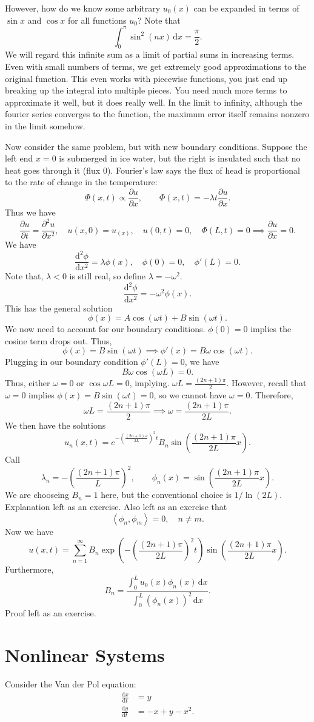 However, how do we know some arbitrary $u_0(x)$ can be expanded in terms of $\sin x$ and $\cos x$ for all functions $u_0$? Note that
\[
	\int_{0}^{\pi } \sin ^2(nx) \,\mathrm{d} x=\frac{\pi }{2}
.\]
We will regard this infinite sum as a limit of partial sums in increasing terms. Even with small numbers of terms, we get extremely good approximations to the original function. This even works with piecewise functions, you just end up breaking up the integral into multiple pieces. You need much more terms to approximate it well, but it does really well. In the limit to infinity, although the fourier series converges to the function, the maximum error itself remains nonzero in the limit somehow.

Now consider the same problem, but with new boundary conditions. Suppose the left end $x=0$ is submerged in ice water, but the right is insulated such that no heat goes through it (flux 0). Fourier's law says the flux of head is proportional to the rate of change in the temperature:
\[
	\Phi(x,t) \propto \frac{\partial u}{\partial x} ,\qquad \Phi (x,t)=-\lambda t \frac{\partial u}{\partial x} 
.\]
Thus we have
\[
	\frac{\partial u}{\partial t} =\frac{\partial ^2u}{\partial x^2} ,\quad u(x,0)=u_(x),\quad u(0,t)=0,\quad \Phi (L,t)=0\implies \frac{\partial u}{\partial x} =0
.\]
We have
\[
	\frac{\mathrm{d}^2\phi  }{\mathrm{d}x^2} =\lambda \phi (x),\quad \phi (0)=0,\quad \phi '(L)=0
.\]
Note that, $\lambda <0$ is still real, so define $\lambda =-\omega ^2$.
\[
	\frac{\mathrm{d}^2\phi }{\mathrm{d}x^2} =-\omega ^2\phi (x)
.\]
This has the general solution
\[
	\phi (x)=A\cos (\omega t)+B\sin (\omega t)
.\]
We now need to account for our boundary conditions. $\phi (0)=0$ implies the cosine term drops out. Thus,
\[
	\phi (x)=B\sin (\omega t)\implies \phi '(x)=B\omega \cos (\omega t)
.\]
Plugging in our boundary condition $\phi '(L)=0$, we have
\[
	B\omega \cos (\omega L)=0
.\]
Thus, either $\omega =0$ or $\cos \omega L=0$, implying. $\omega L = \frac{(2n+1)\pi }{2}$. However, recall that $\omega =0$ implies $\phi (x)=B\sin (\omega t)=0$, so we cannot have $\omega =0$. Therefore,
\[
	\omega L=\frac{(2n+1)\pi }{2}\implies \omega =\frac{(2n+1)\pi  }{2L}
.\]
We then have the solutions
\[
	u_n(x,t)=e^{-\left( \frac{(2n+1)\omega }{2L} \right) ^2t}B_n\sin \left( \frac{(2n+1)\pi }{2L}x \right)
.\]
Call
\[
	\lambda _n = -\left( \frac{(2n+1)\pi }{L} \right) ^2,\qquad \phi _n(x)=\sin \left( \frac{(2n+1)\pi }{2L}x \right) 
.\]
We are chooseing $B_n=1$ here, but the conventional choice is $1 /\ln (2L)$. Explanation left as an exercise. Also left as an exercise that
\[
	\left<\phi_n,\phi _m \right> =0,\quad n\neq m
.\]
Now we have
\[
	u(x,t)=\sum_{n=1}^{\infty} B_n \exp \left( -\left( \frac{(2n+1)\pi }{2L} \right) ^2 t\right) \sin \left( \frac{(2n+1)\pi }{2L}x \right) 
.\]
Furthermore,
\[
	B_n = \frac{\int_{0}^{L} u_0(x)\phi _n(x) \,\mathrm{d} x}{\int_{0}^{L} \left( \phi _n(x) \right) ^2 \,\mathrm{d} x}
.\]
Proof left as an exercise.
\chapter{Nonlinear Systems}
Consider the Van der Pol equation:
\begin{align*}
	\frac{\mathrm{d}x}{\mathrm{d}t} &=y\\
	\frac{\mathrm{d}y}{\mathrm{d}t} &=-x+y-x^2
.\end{align*}

